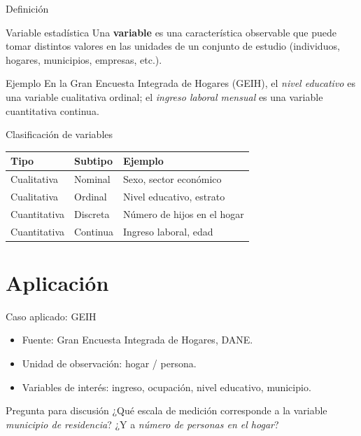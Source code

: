 \documentclass[aspectratio=169,11pt]{beamer}
\begin{document}
\begin{frame}{Definición}
  \begin{block}{Variable estadística}
    Una \textbf{variable} es una característica observable que puede tomar distintos valores
    en las unidades de un conjunto de estudio (individuos, hogares, municipios, empresas, etc.).
  \end{block}
  \vspace{0.3cm}
  \begin{alertblock}{Ejemplo}
    En la Gran Encuesta Integrada de Hogares (GEIH), el \emph{nivel educativo} es una variable
    cualitativa ordinal; el \emph{ingreso laboral mensual} es una variable cuantitativa continua.
  \end{alertblock}
\end{frame}

\begin{frame}{Clasificación de variables}
  \begin{table}
    \centering
    \begin{tabular}{lll}
      \toprule
      \textbf{Tipo} & \textbf{Subtipo} & \textbf{Ejemplo} \\
      \midrule
      Cualitativa & Nominal & Sexo, sector económico \\
      Cualitativa & Ordinal & Nivel educativo, estrato \\
      Cuantitativa & Discreta & Número de hijos en el hogar \\
      Cuantitativa & Continua & Ingreso laboral, edad \\
      \bottomrule
    \end{tabular}
  \end{table}
\end{frame}

\section{Aplicación}

\begin{frame}{Caso aplicado: GEIH}
  \begin{itemize}
    \item Fuente: Gran Encuesta Integrada de Hogares, DANE.
    \item Unidad de observación: hogar / persona.
    \item Variables de interés: ingreso, ocupación, nivel educativo, municipio.
  \end{itemize}
  \vspace{0.3cm}
  \begin{block}{Pregunta para discusión}
    ¿Qué escala de medición corresponde a la variable \emph{municipio de residencia}? ¿Y a
    \emph{número de personas en el hogar}?
  \end{block}
\end{frame}
\end{document}
